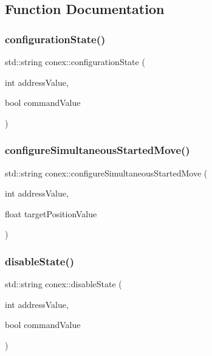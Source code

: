 \subsection{Function Documentation}
\mbox{\label{namespaceconex_aa9f0011a56576d7e9382d9d7d211e946}} 
\subsubsection{\texorpdfstring{configuration\+State()}{configurationState()}}
{\footnotesize\ttfamily std\+::string conex\+::configuration\+State (\begin{DoxyParamCaption}\item[{int}]{address\+Value,  }\item[{bool}]{command\+Value }\end{DoxyParamCaption})}

\mbox{\label{namespaceconex_a5fe4df9385c4ac7842eee6c04fa6bda6}} 
\subsubsection{\texorpdfstring{configure\+Simultaneous\+Started\+Move()}{configureSimultaneousStartedMove()}}
{\footnotesize\ttfamily std\+::string conex\+::configure\+Simultaneous\+Started\+Move (\begin{DoxyParamCaption}\item[{int}]{address\+Value,  }\item[{float}]{target\+Position\+Value }\end{DoxyParamCaption})}

\mbox{\label{namespaceconex_a379241e6a2dafd2c5378ff9029a2afbb}} 
\subsubsection{\texorpdfstring{disable\+State()}{disableState()}}
{\footnotesize\ttfamily std\+::string conex\+::disable\+State (\begin{DoxyParamCaption}\item[{int}]{address\+Value,  }\item[{bool}]{command\+Value }\end{DoxyParamCaption})}

